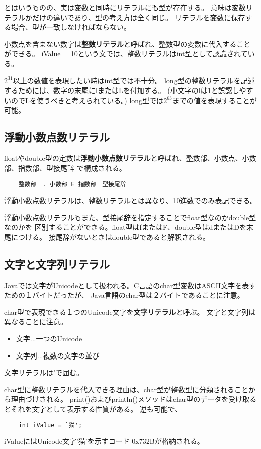 \documentclass[12pt,a4j,twoside]{jsbook}
\begin{document}
とはいうものの、実は変数と同時にリテラルにも型が存在する。
意味は変数リテラルかだけの違いであり、型の考え方は全く同じ。
リテラルを変数に保存する場合、型が一致しなければならない。

小数点を含まない数字は\textbf{整数リテラル}と呼ばれ、整数型の変数に代入することができる。
iValue = 10という文では、整数リテラルはint型として認識されている。

$2^{31}$以上の数値を表現したい時はint型では不十分。
long型の整数リテラルを記述するためには、数字の末尾にlまたはLを付加する。
(小文字のlは1と誤認しやすいのでLを使うべきと考えられている。)
long型では$2^{63}$までの値を表現することが可能。

\subsection{浮動小数点数リテラル}
floatやdouble型の定数は\textbf{浮動小数点数リテラル}と呼ばれ、整数部、小数点、小数部、指数部、型接尾辞
で構成される。
\begin{lstlisting}
    整数部　. 小数部 E 指数部　型接尾辞
\end{lstlisting}
浮動小数点数リテラルは、整数リテラルとは異なり、10進数でのみ表記できる。

浮動小数点数リテラルもまた、型接尾辞を指定することでfloat型なのかdouble型なのかを
区別することができる。float型はfまたはF、double型はdまたはDを末尾につける。
接尾辞がないときはdouble型であると解釈される。

\subsection{文字と文字列リテラル}
Javaでは文字がUnicodeとして扱われる。C言語のchar型変数はASCII文字を表すための１バイトだったが、
Java言語のchar型は２バイトであることに注意。

char型で表現できる１つのUnicode文字を\textbf{文字リテラル}と呼ぶ。
文字と文字列は異なることに注意。
\begin{itemize}
    \item 文字...一つのUnicode
    \item 文字列...複数の文字の並び
\end{itemize}
文字リテラルは'で囲む。

char型に整数リテラルを代入できる理由は、char型が整数型に分類されることから理由づけされる。
print()およびprintln()メソッドはchar型のデータを受け取るとそれを文字として表示する性質がある。
逆も可能で、
\begin{lstlisting}
    int iValue = `猫';
\end{lstlisting}
iValueにはUnicode文字'猫'を示すコード
0x732Bが格納される。
\end{document}
